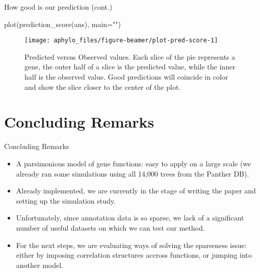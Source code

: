 \documentclass[9pt,handout,ignorenonframetext,]{beamer}
\newenvironment{Shaded}{\begin{snugshade}}{\end{snugshade}}
\newcommand{\KeywordTok}[1]{\textcolor[rgb]{0.94,0.87,0.69}{#1}}
\newcommand{\DataTypeTok}[1]{\textcolor[rgb]{0.87,0.87,0.75}{#1}}
\newcommand{\StringTok}[1]{\textcolor[rgb]{0.80,0.58,0.58}{#1}}
\newcommand{\NormalTok}[1]{\textcolor[rgb]{0.80,0.80,0.80}{#1}}
\begin{document}
\begin{frame}[fragile,t]{How good is our prediction (cont.)}

\footnotesize

\begin{Shaded}
\begin{Highlighting}[]
\KeywordTok{plot}\NormalTok{(}\KeywordTok{prediction_score}\NormalTok{(ans), }\DataTypeTok{main=}\StringTok{""}\NormalTok{)}
\end{Highlighting}
\end{Shaded}

\begin{figure}

{\centering \texttt{[image: aphylo\_files/figure-beamer/plot-pred-score-1]} 

}

\caption{Predicted versus Observed values. Each slice of the pie represents a gene, the outer half of a slice is the predicted value, while the inner half is the observed value. Good predictions will coincide in color and show the slice closer to the center of the plot.}\label{fig:plot-pred-score}
\end{figure}

\normalsize

\end{frame}

\section{Concluding Remarks}\label{concluding-remarks}

\begin{frame}{Concluding Remarks}

\begin{itemize}
\item
  A parsimonious model of gene functions: easy to apply on a large scale
  (we already ran some simulations using all 14,000 trees from the
  Panther DB).\pause
\item
  Already implemented, we are currently in the stage of writing the
  paper and setting up the simulation study.\pause
\item
  Unfortunately, since annotation data is so sparse, we lack of a
  significant number of useful datasets on which we can test our
  method.\pause
\item
  For the next steps, we are evaluating ways of solving the sparseness
  issue: either by imposing correlation structures accross functions, or
  jumping into another model.\pause
\end{itemize}

\end{frame}
\end{document}
